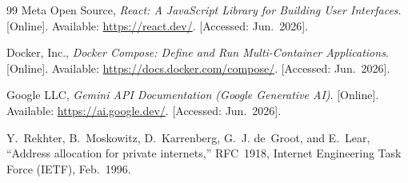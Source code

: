 \documentclass[12pt,a4paper]{report}
\renewcommand{\_}{\textunderscore\allowbreak}
\begin{document}
\begin{thebibliography}{99}
Meta Open Source, \emph{React: A JavaScript Library for Building User Interfaces}. [Online]. Available: \url{https://react.dev/}. [Accessed: Jun.~2026].

Docker, Inc., \emph{Docker Compose: Define and Run Multi-Container Applications}. [Online]. Available: \url{https://docs.docker.com/compose/}. [Accessed: Jun.~2026].

Google LLC, \emph{Gemini API Documentation (Google Generative AI)}. [Online]. Available: \url{https://ai.google.dev/}. [Accessed: Jun.~2026].

Y.~Rekhter, B.~Moskowitz, D.~Karrenberg, G.~J. de~Groot, and E.~Lear, ``Address allocation for private internets,'' RFC~1918, Internet Engineering Task Force (IETF), Feb.~1996.

\end{thebibliography}
\end{document}
